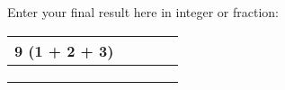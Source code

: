 \documentclass[12pt]{article}
\begin{document}
\noindent Enter your final result here in integer or fraction:

\begin{center}
\begin{tabular}{|l|l|l|l|l|}
\hline
\frac 1 9 (1 + 2 + 3) & \hspace{1mm} & \hspace{1mm} & \hspace{1mm} & \hspace{1mm} \\ \hline
\hspace{1mm} & \hspace{1mm} & \hspace{1mm} & \hspace{1mm} & \hspace{1mm} \\ \hline
\hspace{1mm} & \hspace{1mm} & \hspace{1mm} & \hspace{1mm} & \hspace{1mm} \\ \hline
\hspace{1mm} & \hspace{1mm} & \hspace{1mm} & \hspace{1mm} & \hspace{1mm} \\ \hline
\end{tabular}
\end{center}
\end{document}
